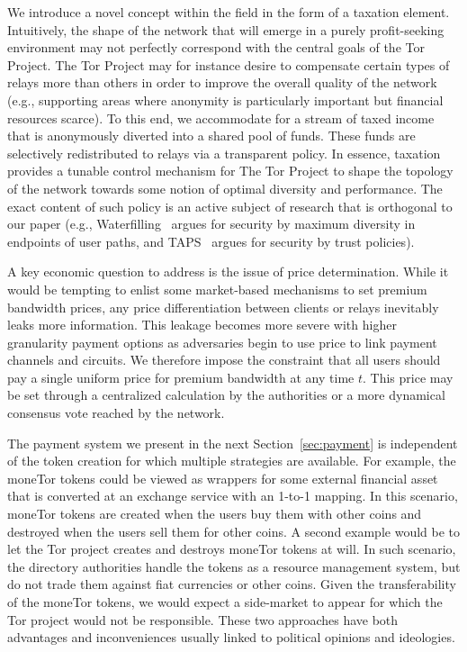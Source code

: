 We introduce a novel concept within the field in the form of a
taxation element. Intuitively, the shape of the network that will
emerge in a purely profit-seeking environment may not perfectly
correspond with the central goals of the Tor Project. The Tor Project
may for instance desire to compensate certain types of relays more
than others in order to improve the overall quality of the network
(e.g., supporting areas where anonymity is particularly important but
financial resources scarce). To this end, we accommodate for a stream
of taxed income that is anonymously diverted into a shared pool of
funds. These funds are selectively redistributed to relays via a
transparent policy.  In essence, taxation provides a tunable control
mechanism for The Tor Project to shape the topology of the network
towards some notion of optimal diversity and performance. The exact
content of such policy is an active subject of research that is
orthogonal to our paper (e.g., Waterfilling~\cite{waterfilling-pets2017} argues for security by maximum diversity in endpoints of user paths, and TAPS~\cite{taps-ndss2017} argues for security by trust policies). 

A key economic question to address is the issue of price determination. While it
would be tempting to enlist some market-based mechanisms to set premium
bandwidth prices, any price differentiation between clients or relays inevitably
leaks more information. This leakage becomes more severe with higher granularity
payment options as adversaries begin to use price to link payment channels and
circuits. We therefore impose the constraint that all users should pay a single
uniform price for premium bandwidth at any time $t$. This price may be set
through a centralized calculation by the authorities or a more dynamical
consensus vote reached by the network.

The payment system we present in the next Section~\ref{sec:payment} is independent of the token creation for which multiple strategies are available. For example, the moneTor tokens could be viewed as wrappers for some external financial asset that is converted at an exchange service with an 1-to-1 mapping. In this scenario, moneTor tokens are created when the users buy them with other coins and destroyed when the users sell them for other coins.  A second example would be to let the Tor project creates and destroys moneTor tokens at will. In such scenario, the directory authorities handle the tokens as a resource management system, but do not trade them against fiat currencies or other coins. Given the transferability of the moneTor tokens, we would expect a side-market to appear for which the Tor project would not be responsible. These two approaches have both advantages and inconveniences usually linked to political opinions and ideologies.

